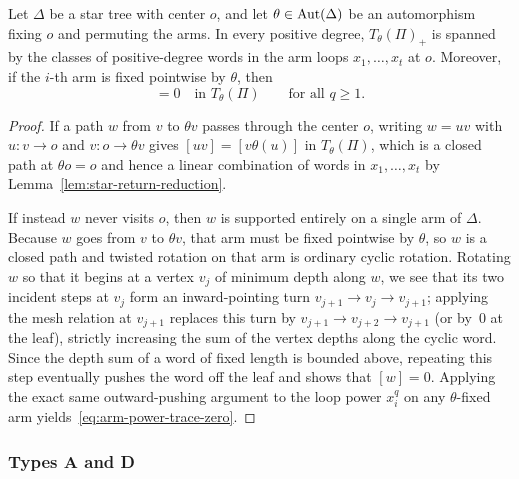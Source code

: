 \begin{lemma}
\label{lem:arm-trace-reduction}
Let $\Delta$ be a star tree with center $o$, and let $\theta\in\operatorname{Aut}(\Delta)$ be an automorphism fixing $o$ and permuting the arms. In every positive degree, $T_\theta(\Pi)_+$ is spanned by the classes of positive-degree words in the arm loops $x_1,\ldots,x_t$ at $o$. Moreover, if the $i$-th arm is fixed pointwise by $\theta$, then
\begin{equation}
  [x_i^q]=0\quad\text{in }T_\theta(\Pi)\qquad\text{for all }q\geq1.
  \label{eq:arm-power-trace-zero}
\end{equation}
\end{lemma}
\begin{proof}
If a path $w$ from $v$ to $\theta v$ passes through the center $o$, writing $w=uv$ with $u\colon v\to o$ and $v\colon o\to\theta v$ gives $[uv]=[v\theta(u)]$ in $T_\theta(\Pi)$, which is a closed path at $\theta o=o$ and hence a linear combination of words in $x_1,\ldots,x_t$ by Lemma~\ref{lem:star-return-reduction}.

If instead $w$ never visits $o$, then $w$ is supported entirely on a single arm of $\Delta$. Because $w$ goes from $v$ to $\theta v$, that arm must be fixed pointwise by $\theta$, so $w$ is a closed path and twisted rotation on that arm is ordinary cyclic rotation. Rotating $w$ so that it begins at a vertex $v_j$ of minimum depth along $w$, we see that its two incident steps at $v_j$ form an inward-pointing turn $v_{j+1}\to v_j\to v_{j+1}$; applying the mesh relation at $v_{j+1}$ replaces this turn by $v_{j+1}\to v_{j+2}\to v_{j+1}$ (or by~$0$ at the leaf), strictly increasing the sum of the vertex depths along the cyclic word. Since the depth sum of a word of fixed length is bounded above, repeating this step eventually pushes the word off the leaf and shows that $[w]=0$. Applying the exact same outward-pushing argument to the loop power $x_i^q$ on any $\theta$-fixed arm yields~\eqref{eq:arm-power-trace-zero}.
\end{proof}

\subsubsection{Types A and D}

